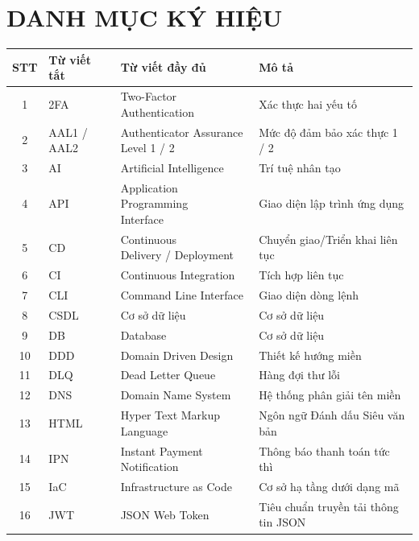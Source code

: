 
\newpage
{}
{\centering \section*{DANH MỤC KÝ HIỆU}} %

\begin{table}[ht]
\centering
\small
\begin{tabular}{|c|p{2.1cm}|p{4.3cm}|p{5.4cm}|}
\hline
\textbf{STT} & \textbf{Từ viết tắt} & \textbf{Từ viết đầy đủ} & \textbf{Mô tả} \\ \hline
1 & 2FA & Two-Factor Authentication & Xác thực hai yếu tố \\ \hline
2 & AAL1 / AAL2 & \makecell[l]{Authenticator Assurance \\ Level 1 / 2} & Mức độ đảm bảo xác thực 1 / 2 \\ \hline
3 & AI & Artificial Intelligence & Trí tuệ nhân tạo \\ \hline
4 & API & \makecell[l]{Application Programming \\ Interface} & Giao diện lập trình ứng dụng \\ \hline
5 & CD & \makecell[l]{Continuous \\ Delivery / Deployment} & Chuyển giao/Triển khai liên tục \\ \hline
6 & CI & Continuous Integration & Tích hợp liên tục \\ \hline
7 & CLI & Command Line Interface & Giao diện dòng lệnh \\ \hline
8 & CSDL & Cơ sở dữ liệu & Cơ sở dữ liệu \\ \hline
9 & DB & Database & Cơ sở dữ liệu \\ \hline
10 & DDD & Domain Driven Design & Thiết kế hướng miền \\ \hline
11 & DLQ & Dead Letter Queue & Hàng đợi thư lỗi \\ \hline
12 & DNS & Domain Name System & Hệ thống phân giải tên miền \\ \hline
13 & HTML & Hyper Text Markup Language & Ngôn ngữ Đánh dấu Siêu văn bản \\ \hline
14 & IPN & Instant Payment Notification & Thông báo thanh toán tức thì \\ \hline
15 & IaC & Infrastructure as Code & Cơ sở hạ tầng dưới dạng mã \\ \hline
16 & JWT & JSON Web Token & Tiêu chuẩn truyền tải thông tin JSON \\ \hline

\end{tabular}
\end{table}
